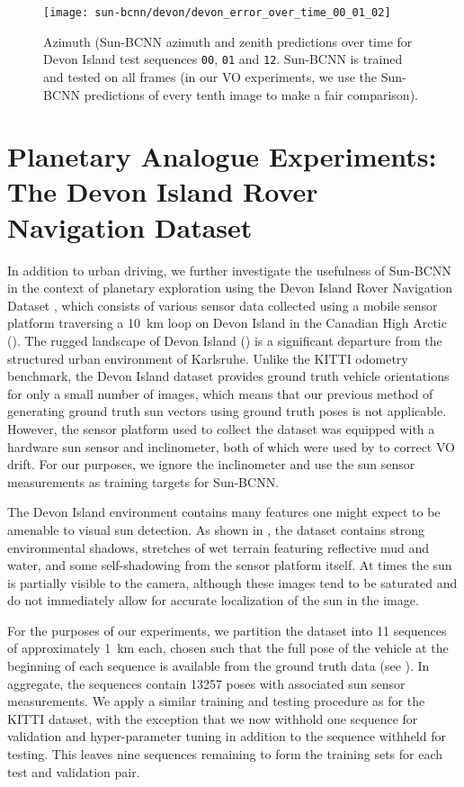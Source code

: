 \begin{figure}
    \centering
    \texttt{[image: sun-bcnn/devon/devon\_error\_over\_time\_00\_01\_02]}
    \caption{Azimuth (Sun-BCNN azimuth and zenith predictions over time for Devon Island test sequences \texttt{00}, \texttt{01} and \texttt{12}. Sun-BCNN is trained and tested on all frames (in our VO experiments, we use the Sun-BCNN predictions of every tenth image to make a fair comparison). }
    \label{fig:sun-bcnn_devon_error_over_time}
\end{figure}

\section{Planetary Analogue Experiments: The Devon Island Rover Navigation Dataset}
In addition to urban driving, we further investigate the usefulness of Sun-BCNN in the context of planetary exploration using the Devon Island Rover Navigation Dataset \citep{Furgale2012-kk}, which consists of various sensor data collected using a mobile sensor platform traversing a 10~km loop on Devon Island in the Canadian High Arctic ().
The rugged landscape of Devon Island () is a significant departure from the structured urban environment of Karlsruhe.
Unlike the KITTI odometry benchmark, the Devon Island dataset provides ground truth vehicle orientations for only a small number of images, which means that our previous method of generating ground truth sun vectors using ground truth poses is not applicable.
However, the sensor platform used to collect the dataset was equipped with a hardware sun sensor and inclinometer, both of which were used by \citet{Lambert2012-sn} to correct VO drift.
For our purposes, we ignore the inclinometer and use the sun sensor measurements as training targets for Sun-BCNN.

The Devon Island environment contains many features one might expect to be amenable to visual sun detection.
As shown in , the dataset contains strong environmental shadows, stretches of wet terrain featuring reflective mud and water, and some self-shadowing from the sensor platform itself.
At times the sun is partially visible to the camera, although these images tend to be saturated and do not immediately allow for accurate localization of the sun in the image.

For the purposes of our experiments, we partition the dataset into 11 sequences of approximately 1~km each, chosen such that the full pose of the vehicle at the beginning of each sequence is available from the ground truth data (see ). In aggregate, the sequences contain 13257 poses with associated sun sensor measurements.
We apply a similar training and testing procedure as for the KITTI dataset, with the exception that we now withhold one sequence for validation and hyper-parameter tuning in addition to the sequence withheld for testing.
This leaves nine sequences remaining to form the training sets for each test and validation pair.

